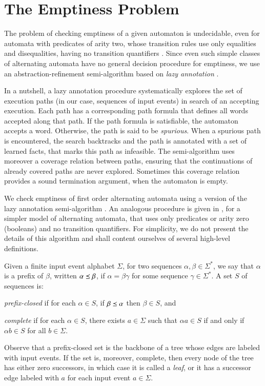 \section{The Emptiness Problem}
\label{sec:emptiness}

The problem of checking emptiness of a given automaton is undecidable,
even for automata with predicates of arity two, whose transition rules
use only equalities and disequalities, having no transition
quantifiers \cite{Farzan15}. Since even such simple classes of
alternating automata have no general decision procedure for emptiness,
we use an abstraction-refinement semi-algorithm based on \emph{lazy
  annotation} \cite{McMillan06,McMillan14}.

In a nutshell, a lazy annotation procedure systematically explores the
set of execution paths (in our case, sequences of input events) in
search of an accepting execution. Each path has a corresponding path
formula that defines all words accepted along that path. If the path
formula is satisfiable, the automaton accepts a word. Otherwise, the
path is said to be \emph{spurious}. When a spurious path is
encountered, the search backtracks and the path is annotated with a
set of learned facts, that marks this path as infeasible. The
semi-algorithm uses moreover a coverage relation between paths,
ensuring that the continuations of already covered paths are never
explored. Sometimes this coverage relation provides a sound
termination argument, when the automaton is empty.

We check emptiness of first order alternating automata using a version
of the \impact~ lazy annotation semi-algorithm \cite{McMillan06}. An
analogous procedure is given in \cite{IosifXu18}, for a simpler model
of alternating automata, that uses only predicates or arity zero
(booleans) and no transition quantifiers. For simplicity, we do not
present the details of this algorithm and shall content ourselves of
several high-level definitions.

Given a finite input event alphabet $\Sigma$, for two sequences
$\alpha, \beta \in \Sigma^*$, we say that $\alpha$ is a prefix of
$\beta$, written $\alpha \preceq \beta$, if $\alpha=\beta\gamma$ for
some sequence $\gamma\in\Sigma^*$. A set $S$ of sequences
is: \begin{compactitem}
\item \emph{prefix-closed} if for each $\alpha \in S$, if $\beta \preceq
\alpha$ then $\beta \in S$, and
\item \emph{complete} if for each $\alpha \in S$, there exists $a \in
  \Sigma$ such that $\alpha a \in S$ if and only if $\alpha b \in S$
  for all $b \in \Sigma$. 
\end{compactitem}
Observe that a prefix-closed set is the backbone of a tree whose edges
are labeled with input events. If the set is, moreover, complete, then
every node of the tree has either zero successors, in which case it is
called a \emph{leaf}, or it has a successor edge labeled with $a$ for
each input event $a \in \Sigma$. 

